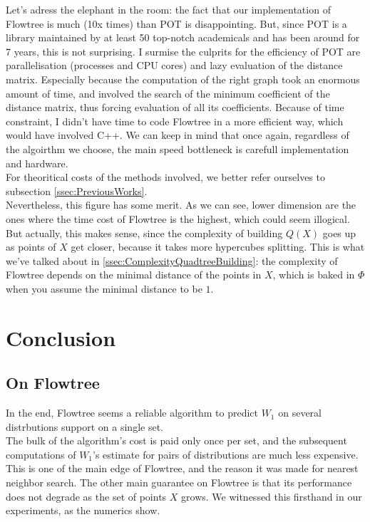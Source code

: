 \documentclass[11pt]{article}
\begin{document}
Let's adress the elephant in the room: the fact that our implementation of Flowtree is much (10x times) than POT is disappointing. But, since POT is a library maintained by at least 50 top-notch academicals and has been around for 7 years, this is not surprising. I surmise the culprits for the efficiency of POT are parallelisation (processes and CPU cores) and lazy evaluation of the distance matrix. Especially because the computation of the right graph took an enormous amount of time, and involved the search of the minimum coefficient of the distance matrix, thus forcing evaluation of all its coefficients. Because of time constraint, I didn't have time to code Flowtree in a more efficient way, which would have involved C++. We can keep in mind that once again, regardless of the algoirthm we choose, the main speed bottleneck is carefull implementation and hardware.\\
For theoritical costs of the methods involved, we better refer ourselves to subsection \ref{ssec:PreviousWorks}.\\

Nevertheless, this figure has some merit. As we can see, lower dimension are the ones where the time cost of Flowtree is the highest, which could seem illogical. But actually, this makes sense, since the complexity of building $Q(X)$ goes up as points of $X$ get closer, because it takes more hypercubes splitting. This is what we've talked about in \ref{ssec:ComplexityQuadtreeBuilding}: the complexity of Flowtree depends on the minimal distance of the points in $X$, which is baked in $\Phi$ when you assume the minimal distance to be $1$. 


\section{Conclusion}

\subsection{On Flowtree}
In the end, Flowtree seems a reliable algorithm to predict $W_1$ on several distrbutions support on a single set.\\
The bulk of the algorithm's cost is paid only once per set, and the subsequent computations of $W_1$'s estimate for pairs of distributions are much less expensive.  This is one of the main edge of Flowtree, and the reason it was made for nearest neighbor search. The other main guarantee on Flowtree is that its performance does not degrade as the set of points $X$ grows. We witnessed this firsthand in our experiments, as the numerics show.\\
\end{document}
